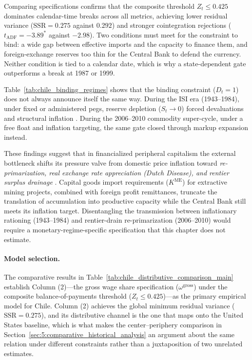 Comparing specifications confirms that the composite threshold $Z_t \le 0.425$ dominates calendar-time breaks across all metrics, achieving lower residual variance ($\text{SSR} = 0.275$ against $0.292$) and stronger cointegration rejections ($t_{\text{ADF}} = -3.89^*$ against $-2.98$). Two conditions must meet for the constraint to bind: a wide gap between effective imports and the capacity to finance them, and foreign-exchange reserves too thin for the Central Bank to defend the currency. Neither condition is tied to a calendar date, which is why a state-dependent gate outperforms a break at 1987 or 1999.

Table~\ref{tab:chile_binding_regimes} shows that the binding constraint ($D_t = 1$) does not always announce itself the same way. During the ISI era (1943--1984), under fixed or administered pegs, reserve depletion ($S_t \to 0$) forced devaluations and structural inflation \citep{Sunkel1958,Prebisch1981}. During the 2006--2010 commodity super-cycle, under a free float and inflation targeting, the same gate closed through markup expansion instead.



These findings suggest that in financialized peripheral capitalism the external bottleneck shifts its pressure valve from domestic price inflation toward \textit{re-primarization, real exchange rate appreciation (Dutch Disease), and rentier surplus drainage} \citep{Palma2019,Ahumada2019}. Capital goods import requirements ($K^{\text{ME}}$) for extractive mining projects, combined with foreign profit remittances, truncate the translation of accumulation into productive capacity while the Central Bank still meets its inflation target. Disentangling the transmission between inflationary rationing (1943--1984) and rentier-drain re-primarization (2006--2010) would require a monetary-regime-specific specification that this chapter does not estimate.

\paragraph{Model selection.} The comparative results in Table~\ref{tab:chile_distributive_comparison_main} establish Column (2)---the gross wage share specification ($\omega^{\text{gross}}$) under the composite balance-of-payments threshold ($Z_t \le 0.425$)---as the primary empirical model for Chile. Column (2) achieves the global minimum residual variance ($\text{SSR} = 0.275$), and its distributive channel is the one that maps onto the United States baseline, which is what makes the center--periphery comparison in Section~\ref{sec:5:comparative_historical_analysis} an argument about the same relation under different constraints rather than a juxtaposition of two unrelated estimates.

